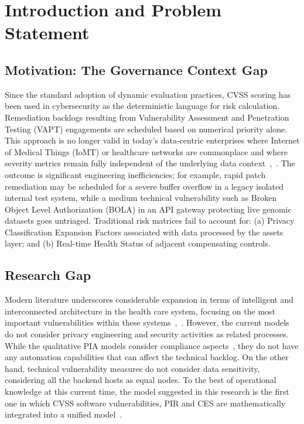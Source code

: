\documentclass[conference,a4paper]{IEEEtran}
\begin{document}
\section{Introduction and Problem Statement}
\subsection{Motivation: The Governance Context Gap}
Since the standard adoption of dynamic evaluation practices, CVSS scoring has been used in cybersecurity as the deterministic language for risk calculation. Remediation backlogs resulting from Vulnerability Assessment and Penetration Testing (VAPT) engagements are scheduled based on numerical priority alone. This approach is no longer valid in today's data-centric enterprises where Internet of Medical Things (IoMT) or healthcare networks are commonplace and where severity metrics remain fully independent of the underlying data context~\cite{b1},~\cite{b2}. The outcome is significant engineering inefficiencies; for example, rapid patch remediation may be scheduled for a severe buffer overflow in a legacy isolated internal test system, while a medium technical vulnerability such as Broken Object Level Authorization (BOLA) in an API gateway protecting live genomic datasets goes untriaged. Traditional risk matrices fail to account for: (a) Privacy Classification Expansion Factors associated with data processed by the assets layer; and (b) Real-time Health Status of adjacent compensating controls.

\subsection{Research Gap}
Modern literature underscores considerable expansion in terms of intelligent and interconnected architecture in the health care system, focusing on the most important vulnerabilities within these systems~\cite{b13},~\cite{b14}. However, the current models do not consider privacy engineering and security activities as related processes. While the qualitative PIA models consider compliance aspects~\cite{b17}, they do not have any automation capabilities that can affect the technical backlog. On the other hand, technical vulnerability measures do not consider data sensitivity, considering all the backend hosts as equal nodes. To the best of operational knowledge at this current time, the model suggested in this research is the first one in which CVSS software vulnerabilities, PIR and CES are mathematically integrated into a unified model~\cite{b19}.
\end{document}
